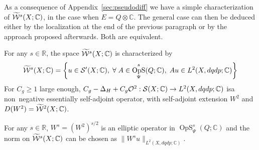 \documentclass[AHL,Unicode,longabstracts]{cedram}
\newcommand{\C}{\mathbb{C}}
\newcommand{\R}{\mathbb{R}}
\newcommand{\clW}{\mathcal{W}}
\newcommand{\clO}{\mathcal{O}}
\newcommand{\clS}{\mathcal{S}}
\DeclareMathOperator{\OpS}{OpS}
\let\oldtilde\tilde
\renewcommand*{\tilde}[1]{\mathchoice{\widetilde{#1}}{\widetilde{#1}}{\oldtilde{#1}}{\oldtilde{#1}}}
\let\oldforall\forall
\renewcommand*{\forall}{\mathrel{\oldforall}}
\let\originalleft\left
\let\originalright\right
\renewcommand{\left}{\mathopen{}\mathclose\bgroup\originalleft}
\renewcommand{\right}{\aftergroup\egroup\originalright}
\renewcommand*{\to}{\mathchoice{\longrightarrow}{\rightarrow}{\rightarrow}{\rightarrow}}
\begin{document}
As a consequence of Appendix~\ref{sec:pseudodiff} we have a simple characterization of $\tilde{\clW}^{s}(X;\C)$, in the case when $E=Q\otimes \C$. The general case can then be deduced either by the localization at the end of the previous paragraph or by the approach proposed afterwards. Both are equivalent.
\begin{prop}\label{pr:characWs}
For any $s\in \R$, the space $\tilde{\clW}^{s}(X;\C)$ is characterized by
\[
\tilde{\clW}^{s}(X;\C)=\left\{u\in \clS'(X;\C),\; \forall A\in \OpS^{s}_{\Psi}(Q;\C),\; Au\in L^{2}(X,dqdp;\C)\right\}
\]
For $C_{g}\geq 1$ large enough, $C_{g}-\Delta_{H}+C_{g}\clO^{2}:\clS(X;\C)\to L^{2}(X,dqdp;\C)$ is\linebreak a non~negative essentially self-adjoint operator, with self-adjoint extension $W^{2}$ and $D(W^{2})=\tilde{\clW}^{2}(X;\C)$.

For any $s\in \R$, $W^{s}=(W^{2})^{s/2}$ is an elliptic operator in $\OpS^{s}_{\Psi}(Q;\C)$ and the norm on $\tilde{\clW}^{s}(X;\C)$ can be chosen as $\|W^{s}u\|_{L^{2}(X,dqdp;\C)}$.
\end{prop}
\end{document}
